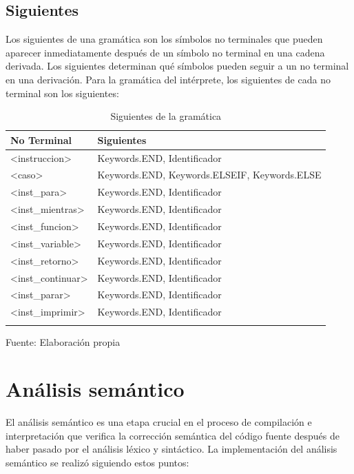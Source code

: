 \subsection{Siguientes}
Los siguientes de una gramática son los símbolos no terminales que pueden aparecer inmediatamente después de un símbolo no terminal en una cadena derivada. Los siguientes determinan qué símbolos pueden seguir a un no terminal en una derivación. Para la gramática del intérprete, los siguientes de cada no terminal son los siguientes:
\begin{center}
  \begin{longtable}{|l|l|}
    \hline
    \textbf{No Terminal} & \textbf{Siguientes} \\
    \hline
    \endfirsthead
    \hline
    \endhead
    \endfoot
    \hline
    <instruccion> & Keywords.END, Identificador \\
    \hline
    <caso> & Keywords.END, Keywords.ELSEIF, Keywords.ELSE \\
    \hline
    <inst\_para> & Keywords.END, Identificador \\
    \hline
    <inst\_mientras> & Keywords.END, Identificador \\
    \hline
    <inst\_funcion> & Keywords.END, Identificador \\
    \hline
    <inst\_variable> & Keywords.END, Identificador \\
    \hline
    <inst\_retorno> & Keywords.END, Identificador \\
    \hline
    <inst\_continuar> & Keywords.END, Identificador \\
    \hline
    <inst\_parar> & Keywords.END, Identificador \\
    \hline
    <inst\_imprimir> & Keywords.END, Identificador \\
    \hline
    \caption{Siguientes de la gramática}
  \end{longtable}
  \vspace*{-2.5em}
  \centering Fuente: Elaboración propia
\end{center}

\section{Análisis semántico}
El análisis semántico es una etapa crucial en el proceso de compilación e interpretación que verifica la corrección semántica del código fuente después de haber pasado por el análisis léxico y sintáctico. La implementación del análisis semántico se realizó siguiendo estos puntos:

